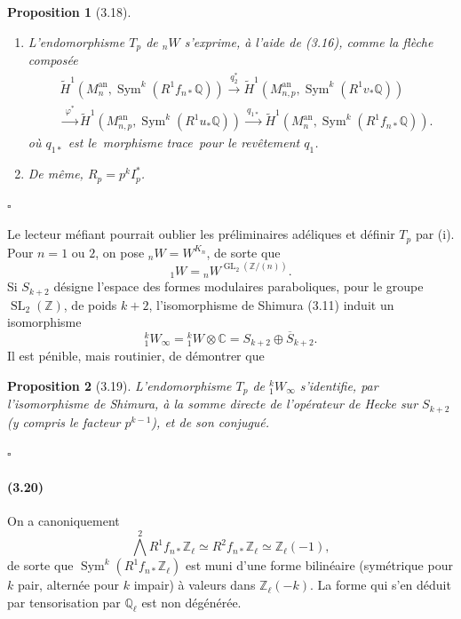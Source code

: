 \documentclass[10pt]{article}
\newcommand{\C}{\mathbb C}
\newcommand{\Q}{\mathbb Q}
\newcommand{\Z}{\mathbb Z}
\newcommand{\GL}{\operatorname{GL}}
\newcommand{\SL}{\operatorname{SL}}
\newcommand{\Sym}{\operatorname{Sym}}
\newcommand{\an}{\mathrm{an}}
\newcommand{\QED}{\hfill$\square$}
\newcommand{\frquote}[1]{\guillemotleft{}\,#1\,\guillemotright{}}
\newtheorem*{proposition}{Proposition}
\begin{document}
\begin{proposition}[3.18]
\leavevmode
\begin{enumerate}[label=(\roman*)]
\item L'endomorphisme $T_p$ de ${}_nW$ s'exprime, à l'aide de (3.16), comme la flèche composée
\[
\begin{aligned}
&\widetilde H^1(M_n^{\an},\Sym^k(R^1f_{n*}\Q))
\xrightarrow{\ q_2^*\ }
\widetilde H^1(M_{n,p}^{\an},\Sym^k(R^1v_*\Q))\\
&\xrightarrow{\ \varphi^*\ }
\widetilde H^1(M_{n,p}^{\an},\Sym^k(R^1u_*\Q))
\xrightarrow{\ q_{1*}\ }
\widetilde H^1(M_n^{\an},\Sym^k(R^1f_{n*}\Q)).
\end{aligned}
\]
où $q_{1*}$ est le \frquote{morphisme trace} pour le revêtement $q_1$.
\item De même, $R_p=p^kI_p^*$.
\end{enumerate}
\end{proposition}
\QED

Le lecteur méfiant pourrait oublier les préliminaires adéliques et définir $T_p$ par (i). Pour $n=1$ ou $2$, on pose ${}_nW=W^{K_n}$, de sorte que
\[
{}_1W={}_nW^{\GL_2(\Z/(n))}.
\]
Si $S_{k+2}$ désigne l'espace des formes modulaires paraboliques, pour le groupe
$\SL_2(\Z)$, de poids $k+2$, l'isomorphisme de Shimura (3.11) induit un isomorphisme
\[
{}^k_1W_\infty={}^k_1W\otimes\C=S_{k+2}\oplus \overline{S}_{k+2}.
\]
Il est pénible, mais routinier, de démontrer que

\begin{proposition}[3.19]
L'endomorphisme $T_p$ de ${}^k_1W_\infty$ s'identifie, par l'isomorphisme de Shimura,
à la somme directe de l'opérateur de Hecke sur $S_{k+2}$ (y compris le facteur $p^{k-1}$),
et de son conjugué.
\end{proposition}
\QED

\paragraph{(3.20)}
On a canoniquement
\[
\bigwedge^2R^1f_{n*}\Z_\ell\simeq R^2f_{n*}\Z_\ell\simeq \Z_\ell(-1),
\]
de sorte que $\Sym^k(R^1f_{n*}\Z_\ell)$ est muni d'une forme bilinéaire (symétrique pour
$k$ pair, alternée pour $k$ impair) à valeurs dans $\Z_\ell(-k)$. La forme qui s'en déduit
par tensorisation par $\Q_\ell$ est non dégénérée.
\end{document}
